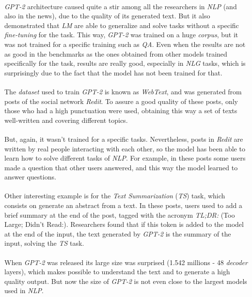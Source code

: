 \paragraph{}
\emph{GPT-2} architecture caused quite a stir among all the researchers in \emph{NLP} (and also in the news), due to the quality of its generated text. But it also demonstrated that \emph{LM} are able to generalize and solve tasks without a specific \emph{fine-tuning} for the task. This way, \emph{GPT-2} was trained on a huge \emph{corpus}, but it was not trained for a specific training such as \emph{QA}. Even when the results are not as good in the benchmarks as the ones obtained from other models trained specifically for the task, results are really good, especially in \emph{NLG} tasks, which is surprisingly due to the fact that the model has not been trained for that.
\paragraph{}
The \emph{dataset} used to train \emph{GPT-2} is known as \emph{WebText}, and was generated from posts of the social network \emph{Redit}. To assure a good quality of these posts, only those who had a high punctuation were used, obtaining this way a set of texts well-written and covering different topics.
\paragraph{}
But, again, it wasn't trained for a specific tasks. Nevertheless, posts in \emph{Redit} are written by real people interacting with each other, so the model has been able to learn how to solve different tasks of \emph{NLP}. For example, in these posts some users made a question that other users answered, and this way the model learned to answer questions. 
\paragraph{}
Other interesting example is for the \emph{Text Summarization} (\emph{TS}) task, which consists on generate an abstract from a text. In these posts, users used to add a brief summary at the end of the post, tagged with the acronym \emph{TL;DR:} (Too Large; Didn't Read:). Researchers found that if this token is added to the model at the end of the input, the text generated by \emph{GPT-2} is the summary of the input, solving the \emph{TS} task.
\paragraph{}
When \emph{GPT-2} was released its large size was surprised (1.542 millions - 48 \emph{decoder} layers), which makes possible to understand the text and to generate a high quality output. But now the size of \emph{GPT-2} is not even close to the largest models used in \emph{NLP}.
